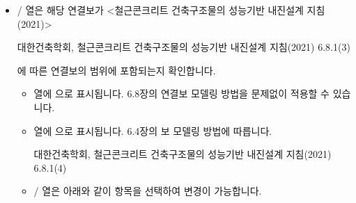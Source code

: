 \documentclass[a4paper,11pt,korean,openany,oneside]{sphinxmanual}
\begin{document}
\begin{itemize}
\begin{description}
\sphinxAtStartPar
{} 열에는 X\sphinxhyphen{}브레이싱의 개수와 각도를 각각 입력합니다.

\end{description}

\item {} \begin{description}
\sphinxAtStartPar
{} /  열은 해당 연결보가 <철근콘크리트 건축구조물의 성능기반 내진설계 지침(2021)> %
\begin{footnote}[1]\sphinxAtStartFootnote
대한건축학회, 철근콘크리트 건축구조물의 성능기반 내진설계 지침(2021) 6.8.1\sphinxhyphen{}(3)
%
\end{footnote}에 따른 연결보의 범위에 포함되는지 확인합니다.
\begin{itemize}
\item {} \begin{description}
\sphinxAtStartPar
{} 열에 으로 표시됩니다.
6.8장의 연결보 모델링 방법을 문제없이 적용할 수 있습니다.

\end{description}

\item {} \begin{description}
\sphinxAtStartPar
{} 열에 으로 표시됩니다.
6.4장의 보 모델링 방법에 따릅니다. %
\begin{footnote}[2]\sphinxAtStartFootnote
대한건축학회, 철근콘크리트 건축구조물의 성능기반 내진설계 지침(2021) 6.8.1\sphinxhyphen{}(4)
%
\end{footnote}

\end{description}

\item {} \begin{description}
\sphinxAtStartPar
{} /  열은 아래와 같이 항목을 선택하여 변경이 가능합니다.

\begin{figure}[htbp]
\centering


\end{figure}
\end{description}
\end{itemize}
\end{description}
\end{itemize}
\end{document}
